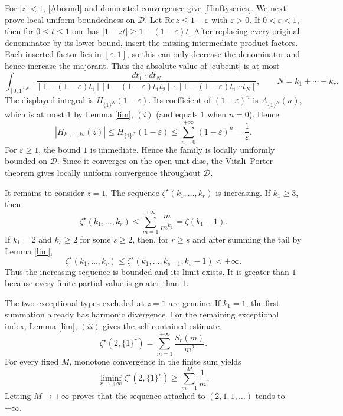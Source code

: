 \documentclass[12pt,a4paper]{amsart}
\makeatletter
\numberwithin{equation}{section}
\renewenvironment{proof}[1][Proof]{%
  \par\pushQED{\qed}%
  \normalfont\topsep6\p@\@plus6\p@\relax
  \trivlist
  \item[\hskip\labelsep\bfseries #1:]\ignorespaces
}{%
  \popQED\endtrivlist\@endpefalse
}
\theoremstyle{plain}
\theoremstyle{definition}
\makeatother
\begin{document}
\begin{proof}
For $|z|<1$, \eqref{Abound} and dominated convergence give \eqref{Hinftyseries}.  We next prove local uniform boundedness on $\mathcal{D}$.  Let $\mathrm{Re}\,z\leq 1-\varepsilon$ with $\varepsilon>0$.  If $0<\varepsilon<1$, then for $0\leq t\leq1$ one has $|1-zt|\geq1-(1-\varepsilon)t$.  After replacing every original denominator by its lower bound, insert the missing intermediate-product factors.  Each inserted factor lies in $[\varepsilon,1]$, so this can only decrease the denominator and hence increase the majorant.  Thus the absolute value of \eqref{cubeint} is at most
\[
\int_{[0,1]^N}
\frac{dt_1\cdots dt_N}
{[1-(1-\varepsilon)t_1]
 [1-(1-\varepsilon)t_1t_2]\cdots
 [1-(1-\varepsilon)t_1\cdots t_N]},
\qquad N=k_1+\cdots+k_r.
\]
The displayed integral is $H_{\{1\}^{N}}(1-\varepsilon)$.  Its coefficient of $(1-\varepsilon)^n$ is $A_{\{1\}^{N}}(n)$, which is at most $1$ by Lemma \ref{lim}, $(i)$ (and equals $1$ when $n=0$).  Hence
\[
|H_{k_1,\ldots,k_r}(z)|
\leq H_{\{1\}^{N}}(1-\varepsilon)
\leq\sum_{n=0}^{+\infty}(1-\varepsilon)^n=\frac1\varepsilon.
\]
For $\varepsilon\geq 1$, the bound $1$ is immediate.  Hence the family is locally uniformly bounded on $\mathcal{D}$.  Since it converges on the open unit disc, the Vitali--Porter theorem \cite{sch} gives locally uniform convergence throughout $\mathcal{D}$.

It remains to consider $z=1$.  The sequence $\zeta^{\star}(k_1,\ldots,k_r)$ is increasing.  If $k_1\geq 3$, then
\[
\zeta^{\star}(k_1,\ldots,k_r)
\leq\sum_{m=1}^{+\infty}\frac{m}{m^{k_1}}
=\zeta(k_1-1).
\]
If $k_1=2$ and $k_s\geq 2$ for some $s\geq 2$, then, for $r\geq s$ and after summing the tail by Lemma \ref{lim},
\[
\zeta^{\star}(k_1,\ldots,k_r)
\leq\zeta^{\star}(k_1,\ldots,k_{s-1},k_s-1)<+\infty.
\]
Thus the increasing sequence is bounded and its limit exists.  It is greater than $1$ because every finite partial value is greater than $1$.
\end{proof}

The two exceptional types excluded at $z=1$ are genuine.  If $k_1=1$, the first summation already has harmonic divergence.  For the remaining exceptional index, Lemma \ref{lim}, $(ii)$ gives the self-contained estimate
\[
\zeta^{\star}(2,\{1\}^{r})
=\sum_{m=1}^{+\infty}\frac{S_r(m)}{m^2}.
\]
For every fixed $M$, monotone convergence in the finite sum yields
\[
\liminf_{r\rightarrow+\infty}\zeta^{\star}(2,\{1\}^{r})
\geq\sum_{m=1}^{M}\frac1m.
\]
Letting $M\rightarrow+\infty$ proves that the sequence attached to $(2,1,1,\ldots)$ tends to $+\infty$.
\end{document}
